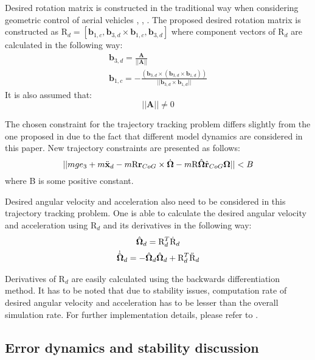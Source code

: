 Desired rotation matrix is constructed in the traditional way when considering geometric control of aerial vehicles \cite{LeeClanak4}, \cite{LeeClanak3}, \cite{LeeClanak2}. The proposed desired rotation matrix is constructed as $\text{R}_d = [\textbf{b}_{1,c}, \textbf{b}_{3,d} \times \textbf{b}_{1,c}, \textbf{b}_{3,d}]$ where component vectors of $\text{R}_d$ are calculated in the following way:
\begin{gather}
	\textbf{b}_{3,d} = \frac{\textbf{A}}{|| \textbf{A} ||} \\
	\textbf{b}_{1,c} = -\frac{(\textbf{b}_{3,d} \times (\textbf{b}_{3,d} \times \textbf{b}_{1,d}))}{||\textbf{b}_{3,d} \times \textbf{b}_{1,d}||}
\end{gather}
\noindent It is also assumed that:
\begin{equation}
	|| \textbf{A} || \neq 0 \label{condition1}
\end{equation}

\noindent The chosen constraint for the trajectory tracking problem differs slightly from the one proposed in \cite{LeeClanak4} due to the fact that different model dynamics are considered in this paper. New trajectory constraints are presented as follows:
\begin{equation}
	|| mge_3 + m\ddot{\textbf{x}}_d 
	- m\text{R}\textbf{r}_{CoG}  \times \dot{\boldsymbol{\Omega}} - m\text{R}\hat{\boldsymbol{\Omega}}\hat{\textbf{r}}_{CoG}\boldsymbol{\Omega}|| < B \label{condition2}
\end{equation}
where B is some positive constant. 

Desired angular velocity and acceleration also need to be considered in this trajectory tracking problem. One is able to calculate the desired angular velocity and acceleration using $\text{R}_d$ and its derivatives in the following way:
\begin{gather}
	\hat{\boldsymbol{\Omega}}_d = \text{R}_d^T \dot{\text{R}}_d \\
	\dot{\hat{\boldsymbol{\Omega}}}_d = - \hat{\boldsymbol{\Omega}}_d\hat{\boldsymbol{\Omega}}_d + \text{R}_d^T \ddot{\text{R}}_d
\end{gather}

Derivatives of $\text{R}_d$ are easily calculated using the backwards differentiation method. It has to be noted that due to stability issues, computation rate of desired angular velocity and acceleration has to be lesser than the overall simulation rate. For further implementation details, please refer to \cite{gitLink}.

\subsection{Error dynamics and stability discussion}

